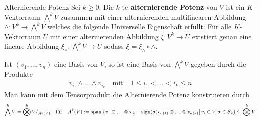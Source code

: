 \begin{definition}{Alternierende Potenz}
    Sei $k \geq 0$. Die $k$-te \textbf{alternierende Potenz} von $V$ ist ein $K$-Vektorraum $\bigwedge^kV$ zusammen mit einer alternierenden multilinearen Abbildung $\wedge: V^k \to \bigwedge^kV$ welches die folgende Universelle Eigenschaft erfüllt:
    Für alle $K$-Vektorraum $U$ mit einer alternierenden Abbildung $\xi: V^k \to U$ existiert genau eine lineare Abbildung $\xi_{\wedge}: \bigwedge^kV \to U$ sodass $\xi = \xi_{\wedge} \circ \wedge$.
    
    Ist $(v_{1}, \ldots, v_{n})$ eine Basis von $V$, so ist eine Basis von $\bigwedge^kV$ gegeben durch die Produkte
    \begin{align*}
        v_{i_1} \wedge \ldots \wedge v_{i_k} \quad \text{mit} \quad 1 \leq i_{1} < \ldots < i_k \leq n
    \end{align*}
    Man kann mit dem Tensorprodukt die Alternierende Potenz konstruieren durch
    \begin{align*}
        \bigwedge^k V = \bigotimes^kV/_{A^k(V)} \quad \text{für} \quad
        A^k(V) := \operatorname{span} \left\{v_1 \otimes \ldots \otimes v_k - \text{sign}(\sigma) v_{\sigma(1)} \otimes \ldots \otimes v_{\sigma(k)}\right | v_i \in V, \sigma \in S_k\} \subseteq \bigotimes^kV
    \end{align*}
\end{definition}


